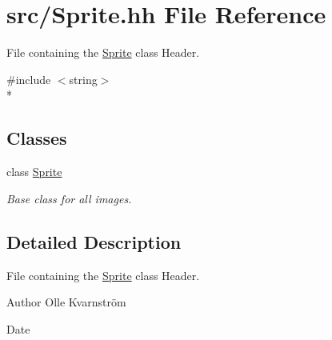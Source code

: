 \hypertarget{Sprite_8hh}{\section{src/\-Sprite.hh File Reference}
\label{Sprite_8hh}
}


File containing the \hyperlink{classSprite}{Sprite} class Header.  


{\ttfamily \#include $<$string$>$}\\*
\subsection*{Classes}
\begin{DoxyCompactItemize}
\item 
class \hyperlink{classSprite}{Sprite}
\begin{DoxyCompactList}\small\item\em Base class for all images. \end{DoxyCompactList}\end{DoxyCompactItemize}


\subsection{Detailed Description}
File containing the \hyperlink{classSprite}{Sprite} class Header. \begin{DoxyAuthor}{Author}
Olle Kvarnström 
\end{DoxyAuthor}
\begin{DoxyDate}{Date}

\end{DoxyDate}
